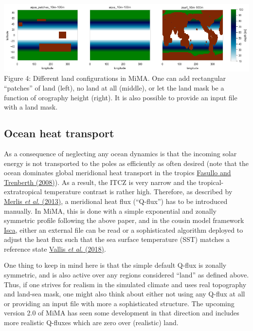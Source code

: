 \includegraphics{heat_cap.png}\\
Figure 4: Different land configurations in MiMA. One can add rectangular
``patches'' of land (left), no land at all (middle), or let the land
mask be a function of orography height (right). It is also possible to
provide an input file with a land mask.

\subsection{Ocean heat transport}\label{ocean-heat-transport}

As a consequence of neglecting any ocean dynamics is that the incoming
solar energy is not transported to the poles as efficiently as often
desired (note that the ocean dominates global meridional heat transport
in the tropics \href{https://doi.org/10.1175/2007JCLI1936.1}{Fasullo and
Trenberth (2008)}). As a result, the ITCZ is very narrow and the
tropical-extratropical temperature contrast is rather high. Therefore,
as described by
\href{http://journals.ametsoc.org/doi/abs/10.1175/JCLI-D-11-00716.1}{Merlis
\emph{et al.} (2013)}, a meridional heat flux (``Q-flux'') has to be
introduced manually. In MiMA, this is done with a simple exponential and
zonally symmetric profile following the above paper, and in the cousin
model framework \href{https://execlim.github.com/Isca}{Isca}, either an
external file can be read or a sophisticated algorithm deployed to
adjust the heat flux such that the sea surface temperature (SST) matches
a reference state
\href{https://www.geosci-model-dev.net/11/843/2018/}{Vallis \emph{et
al.} (2018)}.

One thing to keep in mind here is that the simple default Q-flux is
zonally symmetric, and is also active over any regions considered
``land'' as defined above. Thus, if one strives for realism in the
simulated climate and uses real topography and land-sea mask, one might
also think about either not using any Q-flux at all or providing an
input file with more a sophisticated structure. The upcoming version 2.0
of MiMA has seen some development in that direction and includes more
realistic Q-fluxes which are zero over (realistic) land.


